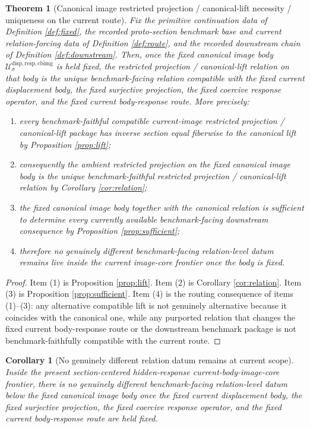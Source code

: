 \documentclass[11pt]{article}
\newcommand{\CanonicalImageBody}[1]{\mathcal U_{#1}^{\mathrm{disp,resp,cbimg}}}
\newtheorem{corollary}{Corollary}
\newtheorem{theorem}{Theorem}
\begin{document}
\begin{theorem}[Canonical image restricted projection / canonical-lift necessity / uniqueness on the current route]
\label{thm:main}
Fix the primitive continuation data of Definition \ref{def:fixed}, the recorded proto-section benchmark base and current relation-forcing data of Definition \ref{def:route}, and the recorded downstream chain of Definition \ref{def:downstream}. Then, once the fixed canonical image body \(\CanonicalImageBody{\sigma}\) is held fixed, the restricted projection / canonical-lift relation on that body is the unique benchmark-facing relation compatible with the fixed current displacement body, the fixed surjective projection, the fixed coercive response operator, and the fixed current body-response route. More precisely:
\begin{enumerate}
    \item every benchmark-faithful compatible current-image restricted projection / canonical-lift package has inverse section equal fiberwise to the canonical lift by Proposition \ref{prop:lift};
    \item consequently the ambient restricted projection on the fixed canonical image body is the unique benchmark-faithful restricted projection / canonical-lift relation by Corollary \ref{cor:relation};
    \item the fixed canonical image body together with the canonical relation is sufficient to determine every currently available benchmark-facing downstream consequence by Proposition \ref{prop:sufficient};
    \item therefore no genuinely different benchmark-facing relation-level datum remains live inside the current image-core frontier once the body is fixed.
\end{enumerate}
\end{theorem}

\begin{proof}
Item (1) is Proposition \ref{prop:lift}. Item (2) is Corollary \ref{cor:relation}. Item (3) is Proposition \ref{prop:sufficient}. Item (4) is the routing consequence of items (1)--(3): any alternative compatible lift is not genuinely alternative because it coincides with the canonical one, while any purported relation that changes the fixed current body-response route or the downstream benchmark package is not benchmark-faithfully compatible with the current route.
\end{proof}

\begin{corollary}[No genuinely different relation datum remains at current scope]
\label{cor:minimal}
Inside the present section-centered hidden-response current-body-image-core frontier, there is no genuinely different benchmark-facing relation-level datum below the fixed canonical image body once the fixed current displacement body, the fixed surjective projection, the fixed coercive response operator, and the fixed current body-response route are held fixed.
\end{corollary}
\end{document}
